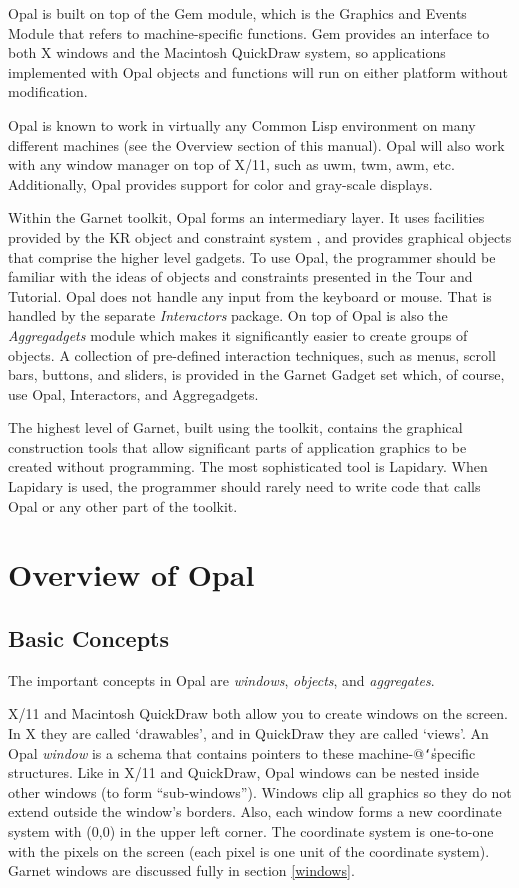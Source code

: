 Opal is built on top of the Gem module, which is the Graphics and Events
Module that refers to machine-specific functions.  Gem provides an
interface to both X windows and the Macintosh QuickDraw system, so
applications implemented with Opal objects and functions will run on
either platform without modification.

Opal is known to work in virtually any Common Lisp environment on many
different machines (see the Overview section of this manual).
Opal will also work with any window manager on top of X/11, such as
uwm, twm, awm, etc.  Additionally, Opal provides support for color and
gray-scale displays.

Within the Garnet toolkit, Opal forms an intermediary layer.  It uses
facilities provided by the KR object and constraint system
\cite{KRTR2}, and provides graphical objects that comprise the higher
level gadgets.  To use Opal, the programmer should be familiar with
the ideas of objects and constraints presented in the Tour and Tutorial.
Opal does not handle any input from the keyboard or mouse.
That is handled by the separate {\it Interactors} package.  On top of Opal is
also the {\it Aggregadgets} module
which makes it significantly easier to create groups of objects.
A collection of pre-defined interaction techniques, such as menus, scroll
bars, buttons, and sliders, is provided in the Garnet Gadget set which, of
course, use Opal, Interactors, and Aggregadgets.

The highest level of Garnet, built using the toolkit, contains the graphical
construction tools that allow significant parts of application graphics to be
created without programming.  The most sophisticated tool is Lapidary.
When Lapidary is used, the programmer should rarely need to write code that
calls Opal or any other part of the toolkit.



\chapter{Overview of Opal}

\section{Basic Concepts}

The important concepts in Opal are {\it windows}, {\it objects}, and
{\it aggregates}.

X/11 and Macintosh QuickDraw both allow you to create windows on the
screen.  In X they are called `drawables', and in QuickDraw they are
called `views'.  An Opal {\it window} is a schema that contains
pointers to these machine-@{\tt\char`\|}specific structures.  Like in X/11 and
QuickDraw, Opal windows can be nested inside other windows (to form
``sub-windows'').
Windows clip all graphics so they do not extend outside the window's borders.
Also, each window forms a new coordinate system with (0,0) in the upper
left corner.  The coordinate system is one-to-one with the pixels on the
screen (each pixel is one unit of the coordinate system).  Garnet windows are
discussed fully in section \ref{windows}.

